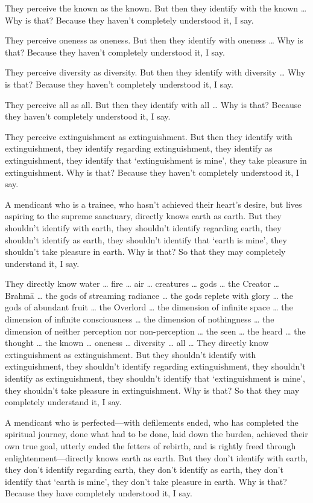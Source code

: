 \documentclass[12pt,openany]{book}%
\begin{document}
They perceive the known as the known. But then they identify with the known … Why is that? Because they haven’t completely understood it, I say. 

They perceive oneness as oneness. But then they identify with oneness … Why is that? Because they haven’t completely understood it, I say. 

They perceive diversity as diversity. But then they identify with diversity … Why is that? Because they haven’t completely understood it, I say. 

They perceive all as all. But then they identify with all … Why is that? Because they haven’t completely understood it, I say. 

They perceive extinguishment as extinguishment. But then they identify with extinguishment, they identify regarding extinguishment, they identify as extinguishment, they identify that ‘extinguishment is mine’, they take pleasure in extinguishment. Why is that? Because they haven’t completely understood it, I say. 

A mendicant who is a trainee, who hasn’t achieved their heart’s desire, but lives aspiring to the supreme sanctuary, directly knows earth as earth. But they shouldn’t identify with earth, they shouldn’t identify regarding earth, they shouldn’t identify as earth, they shouldn’t identify that ‘earth is mine’, they shouldn’t take pleasure in earth. Why is that? So that they may completely understand it, I say. 

They directly know water … fire … air … creatures … gods … the Creator … \textsanskrit{Brahmā} … the gods of streaming radiance … the gods replete with glory … the gods of abundant fruit … the Overlord … the dimension of infinite space … the dimension of infinite consciousness … the dimension of nothingness … the dimension of neither perception nor non-perception … the seen … the heard … the thought … the known … oneness … diversity … all … They directly know extinguishment as extinguishment. But they shouldn’t identify with extinguishment, they shouldn’t identify regarding extinguishment, they shouldn’t identify as extinguishment, they shouldn’t identify that ‘extinguishment is mine’, they shouldn’t take pleasure in extinguishment. Why is that? So that they may completely understand it, I say. 

A mendicant who is perfected—with defilements ended, who has completed the spiritual journey, done what had to be done, laid down the burden, achieved their own true goal, utterly ended the fetters of rebirth, and is rightly freed through enlightenment—directly knows earth as earth. But they don’t identify with earth, they don’t identify regarding earth, they don’t identify as earth, they don’t identify that ‘earth is mine’, they don’t take pleasure in earth. Why is that? Because they have completely understood it, I say. 
\end{document}
